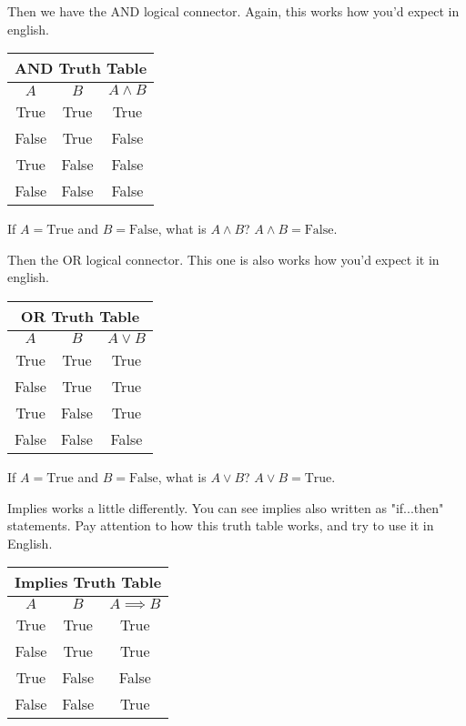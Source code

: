 Then we have the AND logical connector. Again, this works how you'd expect in english.

\begin{tabular}{c|c|c}
	\hline
	\multicolumn{3}{c}{AND Truth Table}\\
	\hline
	$A$ & $B$ & $A \land B$\\
	\hline
	True & True & True\\
	False & True & False\\
	True & False & False\\
	False & False & False\\
	\hline
\end{tabular}

\begin{boxexample}{}{}
	If $A=\text{True}$ and $B=\text{False}$, what is $A \land B$? $A \land B = \text{False}$.
\end{boxexample}

Then the OR logical connector. This one is also works how you'd expect it in english.

\begin{tabular}{c|c|c}
	\hline
	\multicolumn{3}{c}{OR Truth Table}\\
	\hline
	$A$ & $B$ & $A \lor B$\\
	\hline
	True & True & True\\
	False & True & True\\
	True & False & True\\
	False & False & False\\
	\hline
\end{tabular}

\begin{boxexample}{}{}
	If $A=\text{True}$ and $B=\text{False}$, what is $A \lor B$? $A \lor B = \text{True}$.
\end{boxexample}

Implies works a little differently. You can see implies also written as "if...then" statements. Pay attention to how this truth table works, and try to use it in English.

\begin{tabular}{c|c|c}
	\hline
	\multicolumn{3}{c}{Implies Truth Table}\\
	\hline
	$A$ & $B$ & $A \implies B$\\
	\hline
	True & True & True\\
	False & True & True\\
	True & False & False\\
	False & False & True\\
	\hline
\end{tabular}

